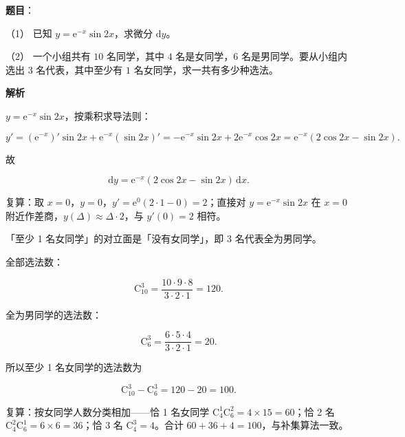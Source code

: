\begin{answer}

\textbf{题目}：

（1） 已知 $y=\mathrm e^{-x}\sin 2x$，求微分 $\mathrm dy$。

（2） 一个小组共有 $10$ 名同学，其中 $4$ 名是女同学，$6$ 名是男同学。要从小组内选出 $3$ 名代表，其中至少有 $1$ 名女同学，求一共有多少种选法。

\textbf{解析}


$y=\mathrm e^{-x}\sin 2x$，按乘积求导法则：

\nopagebreak[4]
\[
y'=(\mathrm e^{-x})'\sin 2x+\mathrm e^{-x}(\sin 2x)'
=-\mathrm e^{-x}\sin 2x+2\mathrm e^{-x}\cos 2x
=\mathrm e^{-x}(2\cos 2x-\sin 2x).
\]

故

\nopagebreak[4]
\[
\mathrm dy=\mathrm e^{-x}(2\cos 2x-\sin 2x)\,\mathrm dx.
\]

复算：取 $x=0$，$y=0$，$y'=\mathrm e^0(2\cdot1-0)=2$；直接对 $y=\mathrm e^{-x}\sin 2x$ 在 $x=0$ 附近作差商，$y(\Delta)\approx\Delta\cdot2$，与 $y'(0)=2$ 相符。


「至少 1 名女同学」的对立面是「没有女同学」，即 3 名代表全为男同学。

全部选法数：

\nopagebreak[4]
\[
\mathrm C_{10}^{3}=\frac{10\cdot9\cdot8}{3\cdot2\cdot1}=120.
\]

全为男同学的选法数：

\nopagebreak[4]
\[
\mathrm C_{6}^{3}=\frac{6\cdot5\cdot4}{3\cdot2\cdot1}=20.
\]

所以至少 1 名女同学的选法数为

\nopagebreak[4]
\[
\mathrm C_{10}^{3}-\mathrm C_{6}^{3}=120-20=100.
\]

复算：按女同学人数分类相加——恰 1 名女同学 $\mathrm C_4^1\mathrm C_6^2=4\times15=60$；恰 2 名 $\mathrm C_4^2\mathrm C_6^1=6\times6=36$；恰 3 名 $\mathrm C_4^3=4$。合计 $60+36+4=100$，与补集算法一致。



\end{answer}
